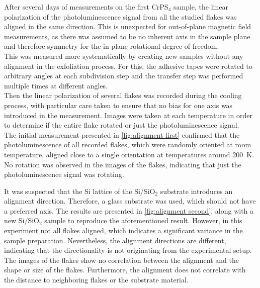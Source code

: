\documentclass[
	twoside,
	parskip=half,
	a4paper,
]{scrbook}
\begin{document}
After several days of measurements on the first CrPS$_4$ sample, the linear polarization of the photoluminescence signal from all the studied flakes was aligned in the same direction.
This is unexpected for out-of-plane magnetic field measurements, as there was assumed to be no inherent axis in the sample plane and therefore symmetry for the in-plane rotational degree of freedom.\\
This was measured more systematically by creating new samples without any alignment in the exfoliation process.
For this, the adhesive tapes were rotated to arbitrary angles at each subdivision step and the transfer step was performed multiple times at different angles.\\
Then the linear polarization of several flakes was recorded during the cooling process, with particular care taken to ensure that no bias for one axis was introduced in the measurement.
Images were taken at each temperature in order to determine if the entire flake rotated or just the photoluminescence signal. \\
The initial measurement presented in \autoref{fig:alignment first} confirmed that the photoluminescence of all recorded flakes, which were randomly oriented at room temperature, aligned close to a single orientation at temperatures around \SI{200}{K}.
No rotation was observed in the images of the flakes, indicating that just the photoluminescence signal was rotating.

It was suspected that the Si lattice of the Si/SiO$_2$ substrate introduces an alignment direction.
Therefore, a glass substrate was used, which should not have a preferred axis.  
The results are presented in \autoref{fig:alignment second}, along with a new Si/SiO$_2$ sample to reproduce the aforementioned result.
However, in this experiment not all flakes aligned, which indicates a significant variance in the sample preparation.
Nevertheless, the alignment directions are different, indicating that the directionality is not originating from the experimental setup.
The images of the flakes show no correlation between the alignment and the shape or size of the flakes. 
Furthermore, the alignment does not correlate with the distance to neighboring flakes or the substrate material.
\end{document}
